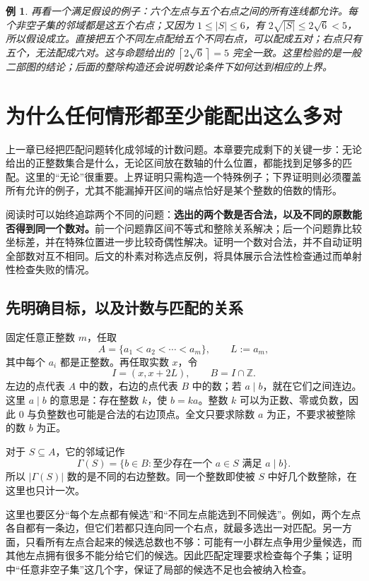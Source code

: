 \documentclass[UTF8,a4paper,oneside,openany,fontset=fandol,zihao=-4]{ctexbook}
\theoremstyle{guide}
\newtheorem{example}[theorem]{例}
\newcommand{\Z}{\mathbb Z}
\newcommand{\ceil}[1]{\left\lceil#1\right\rceil}
\begin{document}
\begin{example}\label{mat:sharp-graph-bound}
再看一个满足假设的例子：六个左点与五个右点之间的所有连线都允许。每个非空子集的邻域都是这五个右点；又因为 $1\leq|S|\leq6$，有 $2\sqrt{|S|}\leq2\sqrt6<5$，所以假设成立。直接把五个不同左点配给五个不同右点，可以配成五对；右点只有五个，无法配成六对。这与命题给出的 $\ceil{2\sqrt6}=5$ 完全一致。这里检验的是一般二部图的结论；后面的整除构造还会说明数论条件下如何达到相应的上界。
\end{example}

\chapter{为什么任何情形都至少能配出这么多对}
\label{low:chapter}

上一章已经把匹配问题转化成邻域的计数问题。本章要完成剩下的关键一步：无论给出的正整数集合是什么，无论区间放在数轴的什么位置，都能找到足够多的匹配。这里的“无论”很重要。上界证明只需构造一个特殊例子；下界证明则必须覆盖所有允许的例子，尤其不能漏掉开区间的端点恰好是某个整数的倍数的情形。

阅读时可以始终追踪两个不同的问题：\textbf{选出的两个数是否合法，以及不同的原数能否得到同一个数对。}前一个问题靠区间不等式和整除关系解决；后一个问题靠比较坐标差，并在特殊位置进一步比较奇偶性解决。证明一个数对合法，并不自动证明全部数对互不相同。后文的朴素对称选点反例，将具体展示合法性检查通过而单射性检查失败的情况。

\section{先明确目标，以及计数与匹配的关系}

固定任意正整数 $m$，任取
\[
  A=\{a_1<a_2<\cdots<a_m\},\qquad L:=a_m,
\]
其中每个 $a_i$ 都是正整数。再任取实数 $x$，令
\[
  I=(x,x+2L),\qquad B=I\cap\Z.
\]
左边的点代表 $A$ 中的数，右边的点代表 $B$ 中的数；若 $a\mid b$，就在它们之间连边。这里 $a\mid b$ 的意思是：存在整数 $k$，使 $b=ka$。整数 $k$ 可以为正数、零或负数，因此 $0$ 与负整数也可能是合法的右边顶点。全文只要求除数 $a$ 为正，不要求被整除的数 $b$ 为正。

对于 $S\subseteq A$，它的邻域记作
\[
  \Gamma(S)=\{b\in B:\text{至少存在一个 }a\in S\text{ 满足 }a\mid b\}.
\]
所以 $|\Gamma(S)|$ 数的是不同的右边整数。同一个整数即使被 $S$ 中好几个数整除，在这里也只计一次。

这里也要区分“每个左点都有候选”和“不同左点能选到不同候选”。例如，两个左点各自都有一条边，但它们若都只连向同一个右点，就最多选出一对匹配。另一方面，只看所有左点合起来的候选总数也不够：可能有一小群左点争用少量候选，而其他左点拥有很多不能分给它们的候选。因此匹配定理要求检查每个子集；证明中“任意非空子集”这几个字，保证了局部的候选不足也会被纳入检查。
\end{document}
